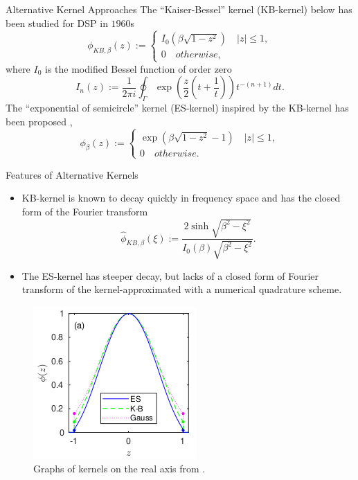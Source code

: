 \documentclass{beamer}
\begin{document}
\begin{frame}{Alternative Kernel Approaches}
  The ``Kaiser-Bessel'' kernel (KB-kernel) below \cite{Book-Kaiser} has been studied for DSP in $1960$s
  \begin{equation}
    \phi_{KB,\beta}(z) :=
    \begin{cases}
      I_{0}\left(\beta\sqrt{1-z^2}\right) \quad |z| \le 1,\\
      0 \quad otherwise,
    \end{cases}
    \label{eq:KB-kernel}
  \end{equation}
  where $I_{0}$ is the modified Bessel function of order zero
  \begin{equation}
    I_{n}(z) := \frac{1}{2\pi i}\oint_{\Gamma}\exp\left(\frac{z}{2}(t+\frac{1}{t})\right)t^{-(n+1)}dt.
  \end{equation}
  The ``exponential of semicircle'' kernel (ES-kernel) inspired by the KB-kernel has been proposed
  \cite{SISC-2019-Barnett}, \cite{IEEE-2021-Barnett}
  \begin{equation}
    \phi_{\beta}(z) :=
    \begin{cases}
      \exp\left(\beta\sqrt{1-z^2} - 1\right) \quad |z| \le 1,\\
      0 \quad otherwise.
    \end{cases}
    \label{eq:ES-kernel}
  \end{equation}
\end{frame}

\begin{frame}{Features of Alternative Kernels}
  \begin{itemize}
    \item KB-kernel is known to decay quickly in frequency space 
      and has the closed form of the Fourier transform 
      \begin{equation}
        \hat{\phi}_{KB,\beta}(\xi) :=
        \frac{2\sinh\sqrt{\beta^2-\xi^2}}{I_{0}(\beta)\sqrt{\beta^2-\xi^2}}.
        \label{eq:FT-KB-kernel}
      \end{equation}
    \item The ES-kernel has steeper decay, but lacks of a closed form of Fourier transform of the kernel-approximated with a numerical quadrature scheme.
  \end{itemize}
  \begin{figure}
    \centering
    \includegraphics[height=.35\textheight,width=.4\textwidth]{images/comparison_kernels.png}
    \caption{Graphs of kernels on the real axis from \cite{SISC-2019-Barnett}.}
    \label{fig:kernel-comparison}
  \end{figure}
\end{frame}
\end{document}
